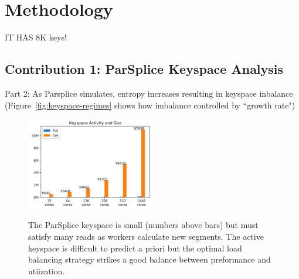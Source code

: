 \section{Methodology}

IT HAS 8K keys!


\subsection{Contribution 1: ParSplice Keyspace Analysis}
Part 2: As Parsplice simulates, entropy increases resulting in keyspace
inbalance (Figure~\ref{fig:keyspace-regimes} shows how imbalance controlled by
``growth rate")


\begin{figure}[tbh]
  \noindent\includegraphics[width=0.5\textwidth]{figures/methodology-keyspace.png}\\
  \caption{ The ParSplice keyspace is small (numbers above bars) but must
  satisfy many reads as workers calculate new segments. The active keyspace is
  difficult to predict a priori but the optimal load balancing strategy strikes a
  good balance between preformance and utiization. 
  \label{fig:methodology-keyspace}}
\end{figure}


